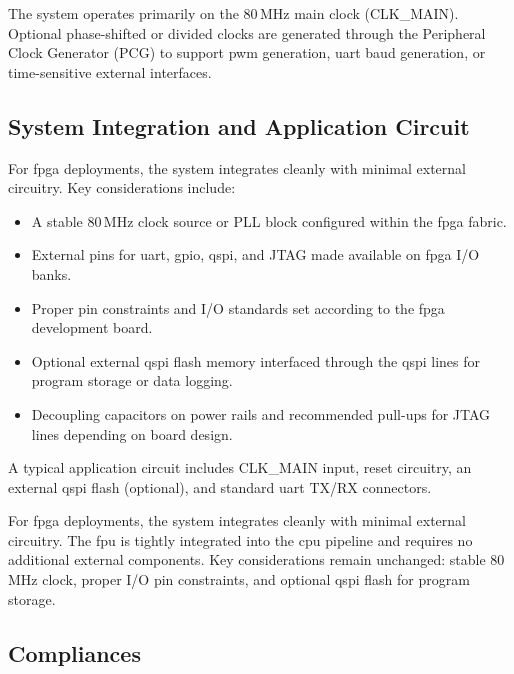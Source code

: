 \begin{itemize}
            The system operates primarily on the 80\,MHz main clock (CLK\_MAIN). Optional
            phase-shifted or divided clocks are generated through the Peripheral Clock
            Generator (PCG) to support \gls{pwm} generation, \gls{uart} baud generation, or
            time-sensitive external interfaces.

            \subsection{System Integration and Application Circuit}

            For \gls{fpga} deployments, the system integrates cleanly with minimal external
            circuitry. Key considerations include:
            \begin{itemize}
                  \item A stable 80\,MHz clock source or PLL block configured within the \gls{fpga}
                        fabric.
                  \item External pins for \gls{uart}, \gls{gpio}, \gls{qspi}, and JTAG made available
                        on \gls{fpga} I/O banks.
                  \item Proper pin constraints and I/O standards set according to the \gls{fpga}
                        development board.
                  \item Optional external \gls{qspi} flash memory interfaced through the \gls{qspi}
                        lines for program storage or data logging.
                  \item Decoupling capacitors on power rails and recommended pull-ups for JTAG lines
                        depending on board design.
            \end{itemize}

            A typical application circuit includes CLK\_MAIN input, reset circuitry, an
            external \gls{qspi} flash (optional), and standard \gls{uart} TX/RX connectors.

            For \gls{fpga} deployments, the system integrates cleanly with minimal external
            circuitry. The \gls{fpu} is tightly integrated into the \gls{cpu} pipeline and
            requires no additional external components. Key considerations remain
            unchanged: stable 80 MHz clock, proper I/O pin constraints, and optional
            \gls{qspi} flash for program storage.

            \subsection{Compliances}


\end{itemize}
